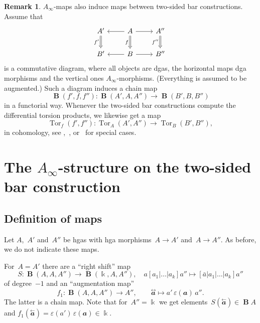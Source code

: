 \documentclass[letterpaper]{amsart}
\numberwithin{equation}{section}
\theoremstyle{plain}
\theoremstyle{definition}
\newtheorem{remark}[theorem]{Remark}
\theoremstyle{remark}
\let\epsilon\varepsilon
\DeclareMathOperator{\Tor}{Tor}
\def\Ainf{A_{\infty}}
\DeclareMathOperator{\BB}{\mathbf{B}}
\def\kk{\Bbbk}
\def\aa{\mathbfit{a}}
\def\laa{\overset{\text{$\leftarrow$}}{\aa}}
\def\taa{\overset{\text{$\leftrightarrow$}}{\aa}}
\def\ff{f_{1}}
\begin{document}
\begin{remark}
  $\Ainf$-maps also induce maps between two-sided bar constructions. Assume that
  \begin{equation}
    \begin{tikzcd}
      A' \arrow[Rightarrow]{d}[left]{f'} & A \arrow{l} \arrow[Rightarrow]{d}[left]{f} \arrow{r} & A'' \arrow[Rightarrow]{d}[left]{f''} \\
      B' & B \arrow{l} \arrow{r} & B''
    \end{tikzcd}
  \end{equation}
  is a commutative diagram, where all objects are dgas,
  the horizontal maps dga morphisms and the vertical ones $\Ainf$-morphisms. (Everything is assumed to be augmented.)
  Such a diagram induces a chain map
  \begin{equation}
    \label{eq:ainf-twosidedbar}
    \BB(f',f,f'') \colon \BB(A',A,A'') \to \BB(B',B,B'')
  \end{equation}
  in a functorial way. Whenever the two-sided bar constructions compute the differential torsion products,
  we likewise get a map
  \begin{equation}
    \Tor_{f}(f',f'')\colon \Tor_{A}(A',A'') \to \Tor_{B}(B',B''),
  \end{equation}
  in cohomology, see \cite[Thm.~3.5$_{*}$]{GugenheimMunkholm:1974},~\cite[Prop.~1.26, Notation~1.33]{Carlson:biquot},
  or~\cite[Thm.~7]{Wolf:1977} for special cases.
\end{remark}



\section{The \texorpdfstring{$\Ainf$}{A∞}-structure on the two-sided bar construction}
\label{sec:ainf-twosided}


\subsection{Definition of maps}

Let $A$,~$A'$ and~$A''$ be hgas with hga morphisms~$A\to A'$ and~$A\to A''$. As before, we do not indicate these maps.

For~$A=A'$ there are a ``right shift'' map
\begin{equation}
  S\colon \BB(A,A,A'') \to \BB(\kk,A,A''),
  \quad
  a[a_{1}|\dots|a_{k}]a'' \mapsto [\bar a|a_{1}|\dots|a_{k}]a''
\end{equation}
of degree~$-1$ and an ``augmentation map''
\begin{equation}
  \label{eq:def-f}
  \ff\colon \BB(A,A,A'') \to A'',
  \qquad
  \taa \mapsto a'\,\epsilon(\aa)\,a''.
\end{equation}
The latter is a chain map. Note that for~$A''=\kk$ we get elements~$S(\laa)\in \BB A$
and $\ff(\laa)=\epsilon(a')\,\epsilon(\aa)\in\kk$.
\end{document}
